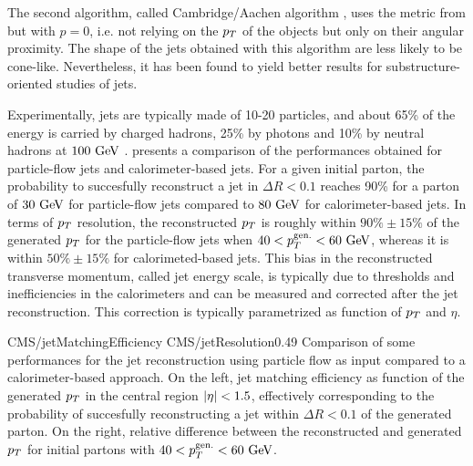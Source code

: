         The second algorithm, called Cambridge/Aachen algorithm \cite{CA}, uses the metric from
         but with $p = 0$, i.e. not relying on the $p_T$ of
        the objects but only on their angular proximity. The shape of the jets obtained with
        this algorithm are less likely to be cone-like. Nevertheless, it has been found to
        yield better results for substructure-oriented studies of jets.


        Experimentally, jets are typically made of 10-20 particles, and about 65\% of the
        energy is carried by charged hadrons, 25\% by photons and 10\% by neutral hadrons
        at $100~\text{GeV}$ \cite{JetPerf}.
         presents a comparison of the performances obtained
        for particle-flow jets and calorimeter-based jets. For a given initial parton, the
        probability to succesfully reconstruct a jet in $\Delta R < 0.1$ reaches 90\% for
        a parton of $30~\text{GeV}$ for particle-flow jets compared to $80~\text{GeV}$ for
        calorimeter-based jets. In terms of $p_T$ resolution, the reconstructed $p_T$ is
        roughly within $90\% \pm 15\%$ of the generated $p_T$ for the particle-flow jets
        when $40 < p_T^\text{gen.} < 60~\text{GeV}$, whereas it is within $50\% \pm 15\%$ for
        calorimeted-based jets. This bias in the reconstructed transverse momentum, called
        jet energy scale, is typically due to thresholds and inefficiencies in the calorimeters
        and can be measured and corrected after the jet reconstruction. This correction is
        typically parametrized as function of $p_T$ and $\eta$.

        {CMS/jetMatchingEfficiency}
        {CMS/jetResolution}{0.49}
        {Comparison \cite{particleFlow} of some performances for the jet reconstruction using particle flow as
        input compared to a calorimeter-based approach. On the left, jet matching efficiency
        as function of the generated $p_T$ in the central region $\left| \eta \right| < 1.5$, effectively
        corresponding to the probability of succesfully reconstructing a jet within
        $\Delta R < 0.1$ of the generated parton. On the right, relative difference between
        the reconstructed and generated $p_T$ for initial partons with $40 < p_T^\text{gen.} < 60~\text{GeV}$.
        }

